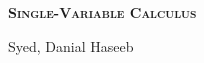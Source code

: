 \documentclass[./main.tex]{subfiles}
\begin{document}
\begin{titlepage}                           %
    \centering                              %
    \selectfont             %
    \vspace*{\fill}                         %
    \scshape                                %
    \Huge \textbf{Single-Variable Calculus} %

    \vspace{0.025 \paperheight}             %

    \Large Syed, Danial Haseeb              %
    \vfill
\end{titlepage}
\end{document}

